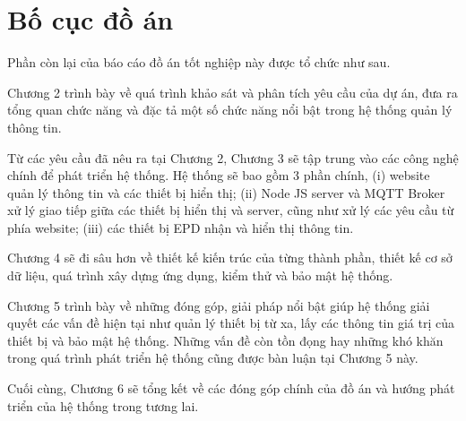 \documentclass[../DoAn.tex]{subfiles}
\begin{document}

\section{Bố cục đồ án}
\label{section:1.4}
Phần còn lại của báo cáo đồ án tốt nghiệp này được tổ chức như sau. 

Chương 2 trình bày về quá trình khảo sát và phân tích yêu cầu của dự án, đưa ra tổng quan chức năng và đặc tả một số chức năng nổi bật trong hệ thống quản lý thông tin.

Từ các yêu cầu đã nêu ra tại Chương 2, Chương 3 sẽ tập trung vào các công nghệ chính để phát triển hệ thống. Hệ thống sẽ bao gồm 3 phần chính, (i) website quản lý thông tin và các thiết bị hiển thị; (ii) Node JS server và MQTT Broker xử lý giao tiếp giữa các thiết bị hiển thị và server, cũng như xử lý các yêu cầu từ phía website; (iii) các thiết bị EPD nhận và hiển thị thông tin.

Chương 4 sẽ đi sâu hơn về thiết kế kiến trúc của từng thành phần, thiết kế cơ sở dữ liệu, quá trình xây dựng ứng dụng, kiểm thử và bảo mật hệ thống.

Chương 5 trình bày về những đóng góp, giải pháp nổi bật giúp hệ thống giải quyết các vấn đề hiện tại như quản lý thiết bị từ xa, lấy các thông tin giá trị của thiết bị và bảo mật hệ thống. Những vấn đề còn tồn đọng hay những khó khăn trong quá trình phát triển hệ thống cũng được bàn luận tại Chương 5 này.

Cuối cùng, Chương 6 sẽ tổng kết về các đóng góp chính của đồ án và hướng phát triển của hệ thống trong tương lai.



\end{document}

